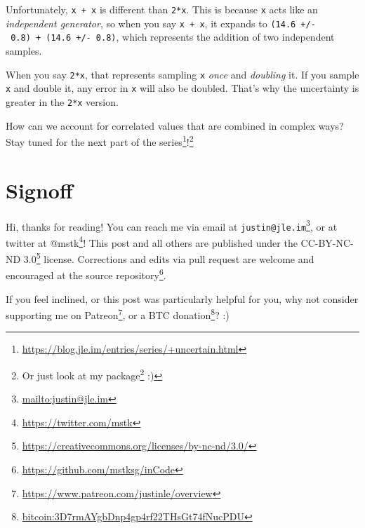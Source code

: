 \documentclass[]{article}
\renewcommand{\href}[2]{#2\footnote{\url{#1}}}
\begin{document}
Unfortunately, \texttt{x\ +\ x} is different than \texttt{2*x}. This is because
\texttt{x} acts like an \emph{independent generator}, so when you say
\texttt{x\ +\ x}, it expands to \texttt{(14.6\ +/-\ 0.8)\ +\ (14.6\ +/-\ 0.8)},
which represents the addition of two independent samples.

When you say \texttt{2*x}, that represents sampling \texttt{x} \emph{once} and
\emph{doubling} it. If you sample \texttt{x} and double it, any error in
\texttt{x} will also be doubled. That's why the uncertainty is greater in the
\texttt{2*x} version.

How can we account for correlated values that are combined in complex ways? Stay
tuned for the next part of the
\href{https://blog.jle.im/entries/series/+uncertain.html}{series}!\footnote{Or
  just look at my \href{https://hackage.haskell.org/package/uncertain}{package}
  :)}

\hypertarget{signoff}{%
\section{Signoff}\label{signoff}}

Hi, thanks for reading! You can reach me via email at
\href{mailto:justin@jle.im}{\nolinkurl{justin@jle.im}}, or at twitter at
\href{https://twitter.com/mstk}{@mstk}! This post and all others are published
under the \href{https://creativecommons.org/licenses/by-nc-nd/3.0/}{CC-BY-NC-ND
3.0} license. Corrections and edits via pull request are welcome and encouraged
at \href{https://github.com/mstksg/inCode}{the source repository}.

If you feel inclined, or this post was particularly helpful for you, why not
consider \href{https://www.patreon.com/justinle/overview}{supporting me on
Patreon}, or a \href{bitcoin:3D7rmAYgbDnp4gp4rf22THsGt74fNucPDU}{BTC donation}?
:)
\end{document}
